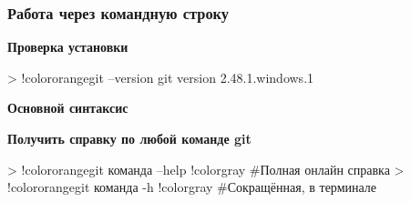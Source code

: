 \documentclass[9pt, aspectratio=1610]{beamer}
\begin{document}
\begin{frame}[fragile]\frametitle{Работа через командную строку}
	
	\textbf{Проверка установки}
	\begin{VerbatimCmd}
		
		> !color{orange}git --version
		git version 2.48.1.windows.1
		
	\end{VerbatimCmd}
	
	\medskip
	
	
	\textbf{Основной синтаксис}
	
		
	\smallskip
	
	\hfill{}\hfill\hspace{0pt}
	
	
	\smallskip
	
	\textbf{Получить справку по любой команде git}
	
	\begin{VerbatimCmd}
		
		> !color{orange}git команда --help !color{gray} #Полная онлайн справка
		> !color{orange}git команда -h !color{gray} #Сокращённая, в терминале
				
	\end{VerbatimCmd}
	
\end{frame}
\end{document}
